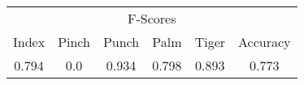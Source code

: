 \documentclass{standalone}
\begin{document}
 
 \begin{tabular}{|c|c|c|c|c ||c|}
\cline{1-6}\multicolumn{6}{|c|}{F-Scores} \\ 
\cline{1-6}Index & Pinch & Punch & Palm & Tiger & Accuracy\\ 
\cline{1-6}0.794 & 0.0 & 0.934 & 0.798 & 0.893 & 0.773\\ 
 \cline{1-6}\hline \end{tabular}
 
\end{document}
